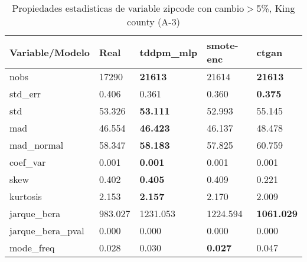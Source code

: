 \begin{table}[H]
\centering
\fontsize{8}{14}\selectfont
\caption{Propiedades estadisticas de variable zipcode con cambio\ensuremath{>}5\%, King county (A-3)}
\label{table-stats-king county-a-3-zipcode-short}
\begin{tabular}{|l|m{10em}|m{10em}|m{10em}|m{10em}|}
\hline
 \rowcolor[gray]{0.8}
Variable/Modelo & Real & tddpm\_mlp & smote-enc & ctgan \\
\hline nobs & 17290 & \bfseries 21613 & \cellcolor[rgb]{0.9, 0.54, 0.52} 21614 & \bfseries 21613 \\
\hline std\_err & 0.406 & 0.361 & \cellcolor[rgb]{0.9, 0.54, 0.52} 0.360 & \bfseries 0.375 \\
\hline std & 53.326 & \bfseries 53.111 & 52.993 & \cellcolor[rgb]{0.9, 0.54, 0.52} 55.145 \\
\hline mad & 46.554 & \bfseries 46.423 & 46.137 & \cellcolor[rgb]{0.9, 0.54, 0.52} 48.478 \\
\hline mad\_normal & 58.347 & \bfseries 58.183 & 57.825 & \cellcolor[rgb]{0.9, 0.54, 0.52} 60.759 \\
\hline coef\_var & 0.001 & \bfseries 0.001 & 0.001 & \cellcolor[rgb]{0.9, 0.54, 0.52} 0.001 \\
\hline skew & 0.402 & \bfseries 0.405 & 0.409 & \cellcolor[rgb]{0.9, 0.54, 0.52} 0.221 \\
\hline kurtosis & 2.153 & \bfseries 2.157 & 2.170 & \cellcolor[rgb]{0.9, 0.54, 0.52} 2.009 \\
\hline jarque\_bera & 983.027 & \cellcolor[rgb]{0.9, 0.54, 0.52} 1231.053 & 1224.594 & \bfseries 1061.029 \\
\hline jarque\_bera\_pval & 0.000 & 0.000 & 0.000 & 0.000 \\
\hline mode\_freq & 0.028 & 0.030 & \bfseries 0.027 & \cellcolor[rgb]{0.9, 0.54, 0.52} 0.047 \\
\hline
\end{tabular}
\end{table}
